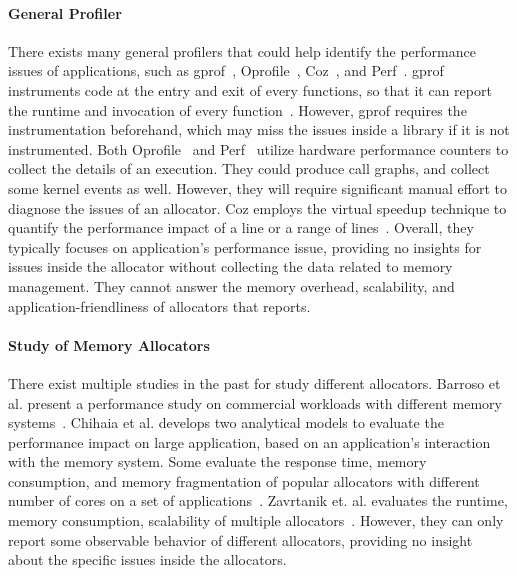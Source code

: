 \paragraph{General Profiler} There exists many general profilers that could help identify the performance issues of applications, such as  gprof~\cite{DBLP:conf/sigplan/GrahamKM82}, Oprofile~\cite{levon2004oprofile}, Coz~\cite{Coz}, and Perf~\cite{perf}. gprof instruments code at the entry and exit of every functions, so that it can report the runtime and invocation of every function~\cite{DBLP:conf/sigplan/GrahamKM82}. However, gprof requires the instrumentation beforehand, which may miss the issues inside a library if it is not instrumented.  Both Oprofile~\cite{levon2004oprofile} and Perf~\cite{perf} utilize hardware performance counters to collect the details of an execution. They could produce call graphs, and collect some kernel events as well. However, they will require significant manual effort to diagnose the issues of an allocator. Coz employs the virtual speedup technique to quantify the performance impact of a line or a range of lines~\cite{Coz}. Overall, they typically focuses on application's performance issue, providing no insights for issues inside the allocator without collecting the data related to memory management. They cannot answer the memory overhead, scalability, and application-friendliness of allocators that \MP{} reports.


\paragraph{Study of Memory Allocators} There exist multiple studies in the past for study different allocators. Barroso et al. present a performance study on  commercial workloads with different memory systems~\cite{Barroso:1998:MSC:279358.279363}. Chihaia et al. develops two analytical models to evaluate the performance impact on large application, based on an application's interaction with the memory system\cite{1291361}. Some evaluate the response time, memory consumption, and memory fragmentation of popular allocators with different number of cores on a set of applications~\cite{6084042, ferreira2011comparison}. Zavrtanik et. al. evaluates the runtime, memory consumption, scalability of multiple allocators~\cite{zavrtanikexperimental}. 
However, they can only report some observable behavior of different allocators, providing no insight about the specific issues inside the allocators. 








